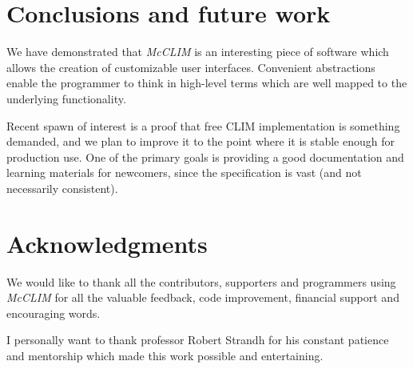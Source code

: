 \documentclass{sig-alternate-05-2015}
\begin{document}
\section{Conclusions and future work}

We have demonstrated that \emph{McCLIM} is an interesting piece of
software which allows the creation of customizable user
interfaces. Convenient abstractions enable the programmer to think in
high-level terms which are well mapped to the underlying
functionality.

Recent spawn of interest is a proof that free CLIM implementation is
something demanded, and we plan to improve it to the point where it is
stable enough for production use. One of the primary goals is
providing a good documentation and learning materials for newcomers,
since the specification is vast (and not necessarily consistent).

\section{Acknowledgments} 

We would like to thank all the contributors, supporters and
programmers using \emph{McCLIM} for all the valuable feedback, code
improvement, financial support and encouraging words.

I personally want to thank professor Robert Strandh for his constant
patience and mentorship which made this work possible and
entertaining.



\end{document}
